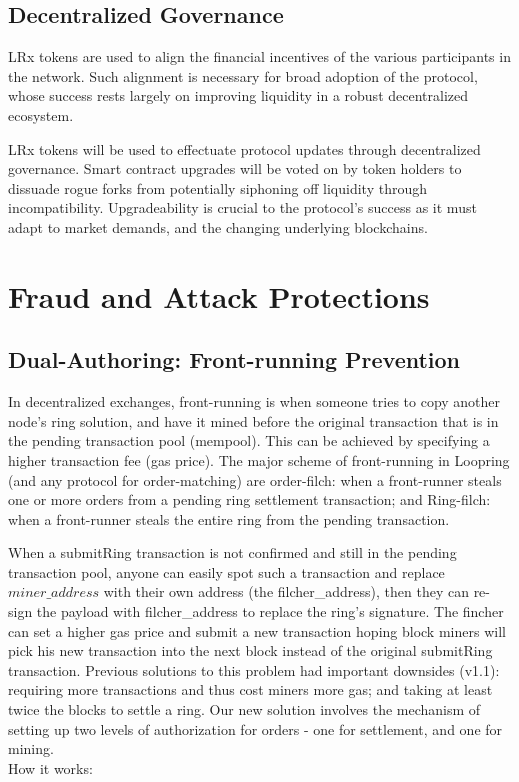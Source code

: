 \documentclass[UTF8,nofonts]{article}
\begin{document}
\subsection{Decentralized Governance}
LRx tokens are used to align the financial incentives of the various participants in the network. Such alignment is necessary for broad adoption of the protocol, whose success rests largely on improving liquidity in a robust decentralized ecosystem.

LRx tokens will be used to effectuate protocol updates through decentralized governance. Smart contract upgrades will be voted on by token holders to dissuade rogue forks from potentially siphoning off liquidity through incompatibility. Upgradeability is crucial to the protocol's success as it must adapt to market demands, and the changing underlying blockchains.

\section{Fraud and Attack Protections}

\subsection{Dual-Authoring: Front-running Prevention}

In decentralized exchanges, front-running is when someone tries to copy another node's ring solution, and have it mined before the original transaction that is in the pending transaction pool (mempool). This can be achieved by specifying a higher transaction fee (gas price). The major scheme of front-running in Loopring (and any protocol for order-matching) are order-filch: when a front-runner steals one or more orders from a pending ring settlement transaction; and Ring-filch: when a front-runner steals the entire ring from the pending transaction.

When a submitRing transaction is not confirmed and still in the pending transaction pool, anyone can easily spot such a transaction and replace $miner\_address$ with their own address (the filcher\_address), then they can re-sign the payload with filcher\_address to replace the ring's signature. The fincher can set a higher gas price and submit a new transaction hoping block miners will pick his new transaction into the next block instead of the original submitRing transaction.
Previous solutions to this problem had important downsides (v1.1): requiring more transactions and thus cost miners more gas; and taking at least twice the blocks to settle a ring.  Our new solution involves the mechanism of setting up two levels of authorization for orders - one for settlement, and one for mining.\\
How it works:
\end{document}
